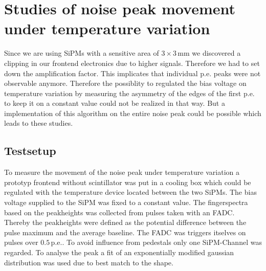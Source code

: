 \section{Studies of noise peak movement under temperature variation}
Since we are using SiPMs with a sensitive area of $3\times3\,\mathrm{mm}$ we discovered a clipping in our frontend electronics due to higher signals. Therefore we had to set down the amplification factor. This implicates that individual p.e. peaks were not observable anymore. Therefore the possiblity to regulated the bias voltage on temperature variation by measuring the asymmetry of the edges of the first p.e. to keep it on a constant value could not be realized in that way. But a implementation of this algorithm on the entire noise peak could be possible which leads to these studies.

\subsection{Testsetup}
To measure the movement of the noise peak under temperature variation a prototyp frontend without scintillator was put in a cooling box which could be regulated with the temperature device located between the two SiPMs. The bias voltage supplied to the SiPM was fixed to a constant value. The fingerspectra based on the peakheights was collected from pulses taken with an FADC. Thereby the peakheights were defined as the potential difference between the pulse maximum and the average baseline. The FADC was triggers itselves on pulses over $0.5\,\mathrm{p.e.}$. To avoid influence from pedestals only one SiPM-Channel was regarded. To analyse the peak a fit of an exponentially modified gaussian distribution was used due to best match to the shape.

